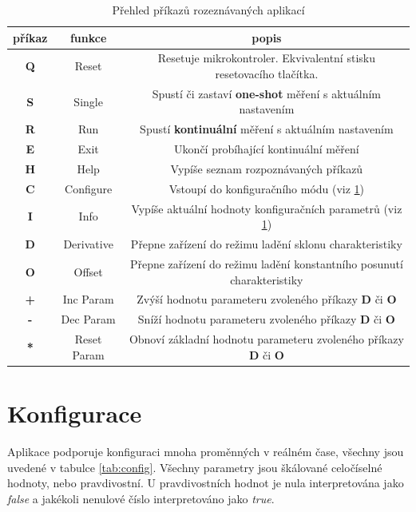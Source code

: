 \documentclass[twoside]{article}
\begin{document}
\begin{table}[htbp]
    \centering
    \begin{tabular}{c|c|c}
        \textbf{příkaz} & \textbf{funkce}  & \textbf{popis} \\ \hline
        \textbf{Q} & Reset & Resetuje mikrokontroler. Ekvivalentní stisku resetovacího tlačítka. \\
        \textbf{S} & Single & Spustí či zastaví \textbf{one-shot} měření s aktuálním nastavením \\
        \textbf{R} & Run & Spustí \textbf{kontinuální} měření s aktuálním nastavením \\
        \textbf{E} & Exit & Ukončí probíhající kontinuální měření\\
        \textbf{H} & Help & Vypíše seznam rozpoznávaných příkazů \\
        \textbf{C} & Configure & Vstoupí do konfiguračního módu (viz \ref{sec:config}) \\
        \textbf{I} & Info & Vypíše aktuální hodnoty konfiguračních parametrů (viz \ref{sec:config}) \\
        \hline
        \textbf{D} & Derivative & Přepne zařízení do režimu ladění sklonu charakteristiky \\       
        \textbf{O} & Offset & Přepne zařízení do režimu ladění konstantního posunutí charakteristiky \\       
        \textbf{+} & Inc Param &   Zvýší hodnotu parameteru zvoleného příkazy \textbf{D} či \textbf{O}\\       
        \textbf{-} & Dec Param &   Sníží hodnotu parameteru zvoleného příkazy \textbf{D} či \textbf{O}\\       
        \textbf{*} & Reset Param & Obnoví základní hodnotu parameteru zvoleného příkazy \textbf{D} či \textbf{O}\\       
    \end{tabular}
    \caption{Přehled příkazů rozeznávaných aplikací}
    \label{tab:commands}
\end{table}

\section{Konfigurace}
\label{sec:config}

Aplikace podporuje konfiguraci mnoha proměnných v reálném čase, všechny jsou uvedené v tabulce \ref{tab:config}.
Všechny parametry jsou škálované celočíselné hodnoty, nebo pravdivostní. U pravdivostních hodnot je nula interpretována
jako \textit{false} a jakékoli nenulové číslo interpretováno jako \textit{true}.
\end{document}
